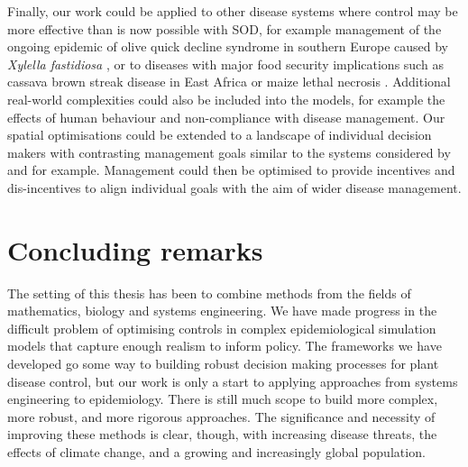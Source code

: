 Finally, our work could be applied to other disease systems where control may be more effective than is now possible with SOD, for example management of the ongoing epidemic of olive quick decline syndrome in southern Europe caused by \emph{Xylella fastidiosa} \citep{sicard_xylella_2018}, or to diseases with major food security implications such as cassava brown streak disease in East Africa \citep{legg_comparing_2011} or maize lethal necrosis \citep{hilker_modeling_2017}. Additional real-world complexities could also be included into the models, for example the effects of human behaviour and non-compliance with disease management. Our spatial optimisations could be extended to a landscape of individual decision makers with contrasting management goals similar to the systems considered by \citet{epanchin_social_2010} and \citet{milne_effect_2015} for example. Management could then be optimised to provide incentives and dis-incentives to align individual goals with the aim of wider disease management.

\section{Concluding remarks}

The setting of this thesis has been to combine methods from the fields of mathematics, biology and systems engineering. We have made progress in the difficult problem of optimising controls in complex epidemiological simulation models that capture enough realism to inform policy. The frameworks we have developed go some way to building robust decision making processes for plant disease control, but our work is only a start to applying approaches from systems engineering to epidemiology. There is still much scope to build more complex, more robust, and more rigorous approaches. The significance and necessity of improving these methods is clear, though, with increasing disease threats, the effects of climate change, and a growing and increasingly global population.
